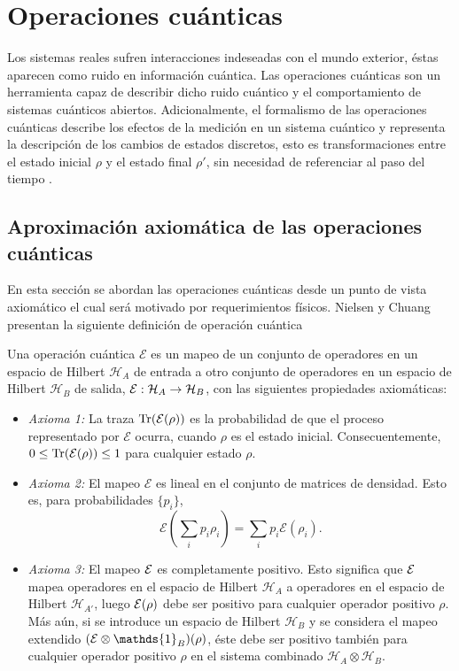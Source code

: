 \section{Operaciones cuánticas}\label{sec:OpCuanticas} %

Los sistemas reales sufren interacciones indeseadas con el mundo exterior, éstas aparecen como ruido en información cuántica. Las operaciones cuánticas son un herramienta capaz de describir dicho ruido cuántico y el comportamiento de sistemas cuánticos abiertos.  Adicionalmente, el formalismo de las operaciones cuánticas describe los efectos de la medición en un sistema cuántico y representa la descripción de los cambios  de estados discretos, esto es transformaciones entre el estado inicial $\rho$ y el estado final $\rho'$, sin necesidad de referenciar al paso del tiempo
{\cite{nielsen_chuang_2010}}.

\subsection{Aproximación axiomática de las operaciones cuánticas} %
En esta sección se abordan las operaciones cuánticas desde un punto de vista
axiomático el cual será motivado por requerimientos físicos. 
Nielsen y
Chuang {\cite{nielsen_chuang_2010}}
presentan la siguiente definición de operación cuántica \begin{definition}\label{DefE(rho)} Una operación cuántica $\mathcal{E}$ es un mapeo de un conjunto de operadores en un espacio de Hilbert $\mathcal{H}_A$ de entrada a otro conjunto de operadores en un espacio de Hilbert $\mathcal{H}_B$ de salida, $\mathcal{E}: \mathcal{H}_A \rightarrow \mathcal{H}_B$, con las siguientes propiedades axiomáticas:

    \begin{itemize}
        \item \textit{Axioma 1:} La traza ${\rm Tr} (\mathcal{E}(\rho))$ es la probabilidad de que el proceso representado por $\mathcal{E}$ ocurra, cuando $\rho$ es el estado inicial. Consecuentemente, $0 \le {\rm Tr} (\mathcal{E}(\rho)) \le 1$ para cualquier estado $\rho$.
	\item \textit{Axioma 2:} El mapeo $\mathcal{E}$ es lineal 
en el conjunto de matrices de densidad.
Esto es, para probabilidades
$\{p_i\}$, \[\mathcal{E}\left(\sum _i p_i \rho _i\right)=\sum_i p_i
\mathcal{E}(\rho_i).\]
	\item\textit{Axioma 3:} El mapeo $\mathcal{E}$ es completamente positivo. Esto
significa que $\mathcal{E}$ mapea  operadores en el espacio de Hilbert
$\mathcal{H}_{A}$  a operadores en el espacio de Hilbert $\mathcal{H}_{A'}$, luego $\mathcal{E}(\rho)$ debe ser positivo para cualquier operador positivo $\rho $. Más aún, si se introduce un espacio de Hilbert $ \mathcal{H}_{B}$ y se considera el mapeo extendido $(\E \otimes \mathds{1}_B)(\rho)$, éste debe ser positivo también para cualquier operador positivo $\rho$ en el sistema combinado $\mathcal{H}_A\otimes \mathcal{H}_B$. 
    \end{itemize}
\end{definition}

